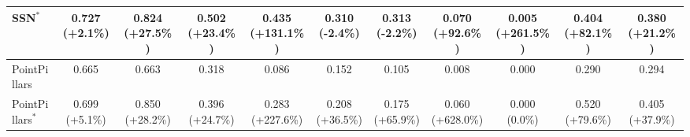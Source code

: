 \begin{table}[htpb]
\begin{tabular}{lcccccccccc}
    SSN$^*$ & 0.727 (+2.1\%) & 0.824 (+27.5\%) & 0.502 (+23.4\%) & 0.435 (+131.1\%) & 0.310 (-2.4\%) & 0.313 (-2.2\%) & 0.070 (+92.6\%) & 0.005 (+261.5\%) & 0.404 (+82.1\%) & 0.380 (+21.2\%) \\
    \midrule
    PointPillars & 0.665 & 0.663 & 0.318 & 0.086 & 0.152 & 0.105 & 0.008 & 0.000 & 0.290 & 0.294 \\
    PointPillars$^*$ & 0.699 (+5.1\%) & 0.850 (+28.2\%) & 0.396 (+24.7\%) & 0.283 (+227.6\%) & 0.208 (+36.5\%) & 0.175 (+65.9\%) & 0.060 (+628.0\%) & 0.000 (0.0\%) & 0.520 (+79.6\%) & 0.405 (+37.9\%) \\
    \bottomrule
    \end{tabular}
    \label{tab:ap_results_0.5}
\end{table}

